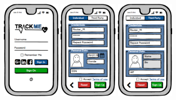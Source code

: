 \documentclass[a4paper]{article}
\begin{document}
        \begin{figure}[!htpb]
    	\centering
    	\includegraphics[height=50mm]{images/mockups/Login_Registration.png}
    	\includegraphics[height=50mm]{images/mockups/RegistrationForm.png}
    	\includegraphics[height=50mm]{images/mockups/ThirdPartyRegistration.png}
        \end{figure}
        
\end{document}
